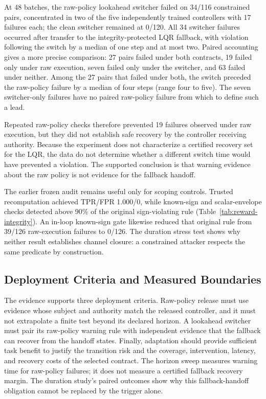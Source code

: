 At 48 batches, the raw-policy lookahead switcher failed on 34/116 constrained
pairs, concentrated in two of the five independently trained controllers with
17 failures each; the clean switcher remained at 0/120.  All 34 switcher
failures occurred after transfer to the integrity-protected LQR fallback, with
violation following the switch by a median of one step and at most two.  Paired
accounting gives a more precise comparison: 27 pairs failed under both
contracts, 19 failed only under raw execution, seven failed only under the
switcher, and 63 failed under neither.  Among the 27 pairs that failed under both, the switch preceded
the raw-policy failure by a median of four steps (range four to five).  The
seven switcher-only failures have no paired raw-policy failure from which to
define such a lead.

Repeated raw-policy checks therefore prevented 19 failures observed under raw
execution, but they did not establish safe recovery by the controller
receiving authority.  Because the experiment does not characterize a certified
recovery set for the LQR, the data do not determine whether a different switch
time would have prevented a violation.  The supported conclusion is that
warning evidence about the raw policy is not evidence for the fallback
handoff.

The earlier frozen audit remains useful only for scoping controls.  Trusted
recomputation achieved TPR/FPR 1.000/0, while known-sign and scalar-envelope
checks detected above 90\% of the original sign-violating rule
(Table~\ref{tab:reward-integrity}).  An in-loop known-sign gate likewise reduced
that original rule from 39/126 raw-execution failures to 0/126.  The duration
stress test shows why neither result establishes channel closure: a constrained
attacker respects the same predicate by construction.

\subsection{Deployment Criteria and Measured Boundaries}

The evidence supports three deployment criteria.  Raw-policy release must use
evidence whose subject and authority match the released controller, and it must
not extrapolate a finite test beyond its declared horizon.  A lookahead
switcher must pair its raw-policy warning rule with independent evidence that
the fallback can recover from the handoff states.  Finally, adaptation should
provide sufficient task benefit to justify the transition risk and the
coverage, intervention, latency, and recovery costs of the selected contract.
The horizon sweep measures warning time for raw-policy failures; it does not
measure a certified fallback recovery margin.  The duration study's paired
outcomes show why this fallback-handoff obligation cannot be replaced by the
trigger alone.

